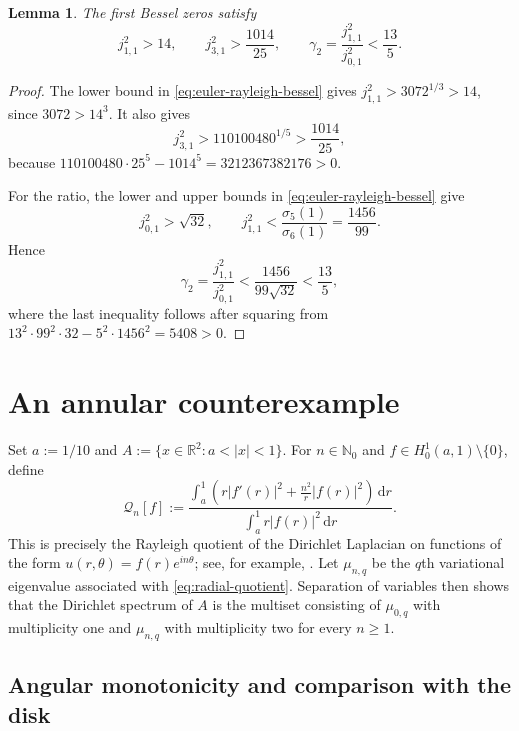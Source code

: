 \documentclass[11pt,letterpaper,reqno]{amsart}
\newtheorem{lemma}[lemma]{Lemma}
\theoremstyle{definition}
\newcommand{\R}{\mathbb{R}}
\newcommand{\dd}{\,\mathrm{d}}
\begin{document}
\begin{lemma}\label{lem:bessel-certificates}
The first Bessel zeros satisfy
\[
 j_{1,1}^2>14,
 \qquad
 j_{3,1}^2>\frac{1014}{25},
 \qquad
 \gamma_2=\frac{j_{1,1}^2}{j_{0,1}^2}<\frac{13}{5}.
\]
\end{lemma}

\begin{proof}
The lower bound in \eqref{eq:euler-rayleigh-bessel} gives
$j_{1,1}^2>3072^{1/3}>14$, since $3072>14^3$.  It also gives
\[
 j_{3,1}^2>110100480^{1/5}>\frac{1014}{25},
\]
because
$110100480\cdot25^5-1014^5=3212367382176>0$.

For the ratio, the lower and upper bounds in
\eqref{eq:euler-rayleigh-bessel} give
\[
 j_{0,1}^2>\sqrt{32},
 \qquad
 j_{1,1}^2<\frac{\sigma_5(1)}{\sigma_6(1)}=\frac{1456}{99}.
\]
Hence
\[
 \gamma_2=\frac{j_{1,1}^2}{j_{0,1}^2}
 <\frac{1456}{99\sqrt{32}}<\frac{13}{5},
\]
where the last inequality follows after squaring from
$13^2\cdot99^2\cdot32-5^2\cdot1456^2=5408>0$.
\end{proof}



\section{An annular counterexample}\label{sec:annulus}

Set $a:=1/10$ and $A:=\{x\in\R^2:a<|x|<1\}$.  For
$n\in\mathbb{N}_0$ and $f\in H_0^1(a,1)\setminus\{0\}$, define
\begin{equation}\label{eq:radial-quotient}
 \mathcal{Q}_n[f]:=
 \frac{\displaystyle\int_a^1
 \left(r|f'(r)|^2+\frac{n^2}{r}|f(r)|^2\right)\dd r}
 {\displaystyle\int_a^1 r|f(r)|^2\dd r}.
\end{equation}
This is precisely the Rayleigh quotient of the Dirichlet Laplacian on
functions of the form $u(r,\theta)=f(r)e^{in\theta}$; see, for example,
\cite[(2.6) and Appendix~A]{AnoopBobkovDrabek2022}.
Let $\mu_{n,q}$ be the $q$th variational eigenvalue associated with
\eqref{eq:radial-quotient}.  Separation of variables then shows that
the Dirichlet spectrum of $A$ is the multiset consisting of $\mu_{0,q}$ with
multiplicity one and $\mu_{n,q}$ with multiplicity two for every $n\geq1$.






\subsection{Angular monotonicity and comparison with the disk}
\end{document}
